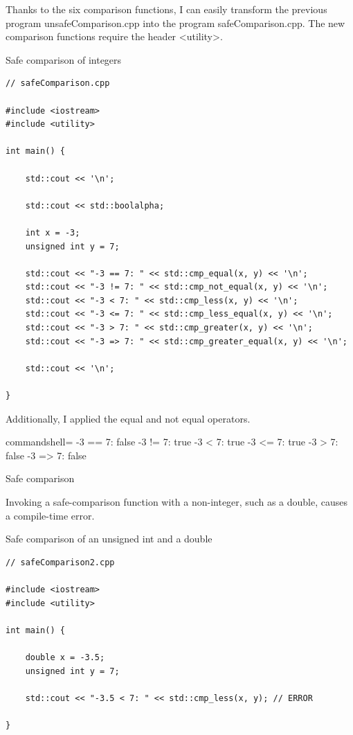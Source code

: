 Thanks to the six comparison functions, I can easily transform the previous program unsafeComparison.cpp into the program safeComparison.cpp. The new comparison functions require the header <utility>.

\noindent
Safe comparison of integers
\begin{lstlisting}[style=styleCXX]
// safeComparison.cpp

#include <iostream>
#include <utility>

int main() {
	
	std::cout << '\n';
	
	std::cout << std::boolalpha;
	
	int x = -3;
	unsigned int y = 7;
	
	std::cout << "-3 == 7: " << std::cmp_equal(x, y) << '\n';
	std::cout << "-3 != 7: " << std::cmp_not_equal(x, y) << '\n';
	std::cout << "-3 < 7: " << std::cmp_less(x, y) << '\n';
	std::cout << "-3 <= 7: " << std::cmp_less_equal(x, y) << '\n';
	std::cout << "-3 > 7: " << std::cmp_greater(x, y) << '\n';
	std::cout << "-3 => 7: " << std::cmp_greater_equal(x, y) << '\n';
	
	std::cout << '\n';
	
}
\end{lstlisting}

Additionally, I applied the equal and not equal operators.

\begin{tcblisting}{commandshell={}}
-3 == 7: false
-3 != 7: true
-3 < 7: true
-3 <= 7: true
-3 > 7: false
-3 => 7: false
\end{tcblisting}

\begin{center}
Safe comparison
\end{center}

Invoking a safe-comparison function with a non-integer, such as a double, causes a compile-time error.

\noindent
Safe comparison of an unsigned int and a double
\begin{lstlisting}[style=styleCXX]
// safeComparison2.cpp

#include <iostream>
#include <utility>

int main() {
	
	double x = -3.5;
	unsigned int y = 7;
	
	std::cout << "-3.5 < 7: " << std::cmp_less(x, y); // ERROR
	
}
\end{lstlisting}

